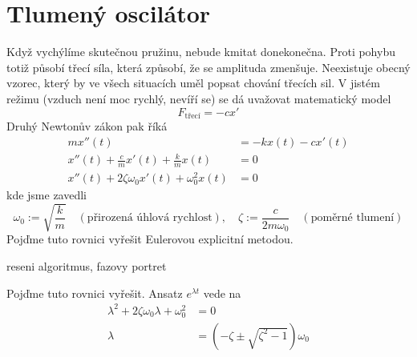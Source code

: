 \section{Tlumený oscilátor}
Když vychýlíme skutečnou pružinu, nebude kmitat donekonečna. Proti pohybu totiž působí třecí síla, která způsobí, že se amplituda zmenšuje. Neexistuje obecný vzorec, který by ve všech situacích uměl popsat chování třecích sil. V jistém režimu (vzduch není moc rychlý, nevíří se) se dá uvažovat matematický model
\begin{equation*}
	F_{\text{třecí}}=-cx'
\end{equation*}
Druhý Newtonův zákon pak říká
\begin{align*}
	mx''(t) &= -kx(t)-cx'(t) \\
	x''(t)+\frac{c}{m}x'(t)+\frac{k}{m}x(t) &= 0 \\
	x''(t)+2\zeta \omega_0 x'(t)+\omega_0^{2}x(t) &= 0
\end{align*}
kde jsme zavedli
\begin{equation*}
	\omega_0:=\sqrt{\frac{k}{m}}\quad (\text{přirozená úhlová rychlost}),\quad \zeta:=\frac{c}{2m\omega_0}\quad (\text{poměrné tlumení})
\end{equation*}
Pojďme tuto rovnici vyřešit Eulerovou explicitní metodou.
\begin{Todo}
	reseni algoritmus, fazovy portret
\end{Todo}

Pojďme tuto rovnici vyřešit. Ansatz $e^{\lambda t}$ vede na
\begin{align*}
	\lambda^{2}+2\zeta \omega_0 \lambda + \omega_0^{2}&=0 \\
	\lambda &= (-\zeta \pm \sqrt{\zeta^{2}-1})\omega_0
\end{align*}

